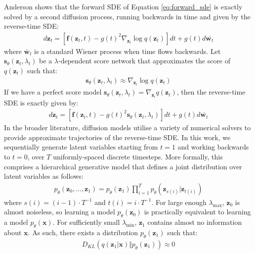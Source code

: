 \documentclass[ oneside,%
                    author={George Herbert},
                    degree={MSci},
                     title={Video Diffusion Models for Climate Simulations},
                  subtitle={}]{dissertation}
\begin{document}
Anderson \cite{Reverse_time_diffusion_Anderson} shows that the forward SDE of Equation \ref{eq:forward_sde} is exactly solved by a second diffusion process, running backwards in time and given by the reverse-time SDE:
\begin{align}
      d\mathbf{z}_t=\left[\mathbf{f}(\mathbf{z}_t, t)-g(t)^2\nabla_{\mathbf{z}_t}\log q(\mathbf{z}_t)\right]dt + g(t)d\bar{\mathbf{w}_t}
\end{align}
where $\bar{\mathbf{w}}_t$ is a standard Wiener process when time flows backwards. Let $\mathbf{s}_\theta(\mathbf{z}_t, \lambda_t)$ be a $\lambda$-dependent score network \cite{Generative_Modelling_By_Estimating_Gradients_Song} that approximates the score of $q(\mathbf{z}_t)$ such that:
\begin{align}
      \mathbf{s}_\theta(\mathbf{z}_t, \lambda_t)\approx \nabla_{\mathbf{z}_t} \log q(\mathbf{z}_t)\label{eq:score_network}
\end{align}
If we have a perfect score model $\mathbf{s}_\theta(\mathbf{z}_t, \lambda_t)=\nabla_{\mathbf{z}_t}q(\mathbf{z}_t)$, then the reverse-time SDE is exactly given by:
\begin{align}
      d\mathbf{z}_t=\left[\mathbf{f}(\mathbf{z}_t, t)-g(t)^2\mathbf{s}_\theta(\mathbf{z}_t, \lambda_t)\right]dt + g(t)d\bar{\mathbf{w}_t}
\end{align}
In the broader literature, diffusion models utilise a variety of numerical solvers to provide approximate trajectories of the reverse-time SDE. In this work, we sequentially generate latent variables starting from $t=1$ and working backwards to $t=0$, over $T$ uniformly-spaced discrete timesteps. More formally, this comprises a hierarchical generative model that defines a joint distribution over latent variables as follows:
\begin{align}
      p_\theta(\mathbf{z}_0,\ldots,\mathbf{z}_1)=p_\theta(\mathbf{z}_1)\prod_{i=1}^T p_\theta(\mathbf{z}_{s(i)}|\mathbf{z}_{t(i)})
\end{align}
where $s(i)=(i - 1)\cdot T^{-1}$ and $t(i)=i\cdot T^{-1}$. For large enough $\lambda_{\max}$, $\mathbf{z}_0$ is almost noiseless, so learning a model $p_\theta(\mathbf{z}_0)$ is practically equivalent to learning a model $p_\theta(\mathbf{x})$. For sufficiently small $\lambda_{\min}$, $\mathbf{z}_1$ contains almost no information about $\mathbf{x}$. As such, there exists a distribution $p_\theta(\mathbf{z}_1)$ such that:
\begin{align}
      D_{KL}(q(\mathbf{z}_1|\mathbf{x})\Vert p_\theta(\mathbf{z}_1))\approx 0
\end{align}
\end{document}
